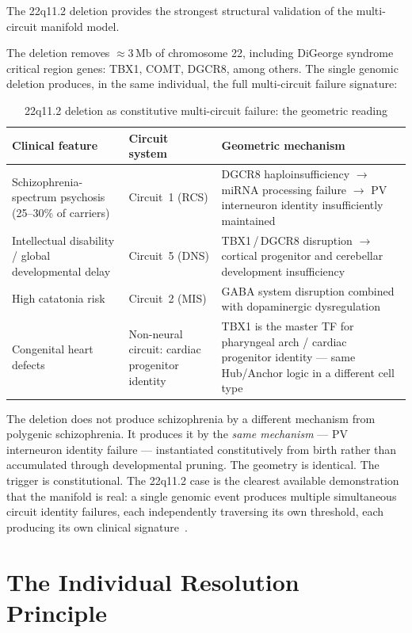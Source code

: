 \documentclass[12pt,a4paper]{article}
\begin{document}
The 22q11.2 deletion provides the strongest structural
validation of the multi-circuit manifold model.

The deletion removes $\approx$3\,Mb of chromosome 22,
including DiGeorge syndrome critical region genes:
TBX1, COMT, DGCR8, among others. The single genomic
deletion produces, in the same individual, the
full multi-circuit failure signature:

\begin{table}[ht!]
\centering
\caption{22q11.2 deletion as constitutive multi-circuit
  failure: the geometric reading}
\label{tab:22q}
\begin{tabular}{p{3.5cm}p{3.0cm}p{5.0cm}}
\toprule
\textbf{Clinical feature} &
\textbf{Circuit system} &
\textbf{Geometric mechanism} \\
\midrule
Schizophrenia-spectrum psychosis
(25--30\% of carriers) &
Circuit~1 (RCS) &
DGCR8 haploinsufficiency
$\to$ miRNA processing failure
$\to$ PV interneuron identity
insufficiently maintained \\[4pt]
Intellectual disability /
global developmental delay &
Circuit~5 (DNS) &
TBX1\,/\,DGCR8 disruption
$\to$ cortical progenitor
and cerebellar development
insufficiency \\[4pt]
High catatonia risk &
Circuit~2 (MIS) &
GABA system disruption
combined with dopaminergic
dysregulation \\[4pt]
Congenital heart defects &
Non-neural circuit:
cardiac progenitor identity &
TBX1 is the master TF for
pharyngeal arch / cardiac
progenitor identity ---
same Hub/Anchor logic
in a different cell type \\
\bottomrule
\end{tabular}
\end{table}

The deletion does not produce schizophrenia by a different
mechanism from polygenic schizophrenia. It produces it by
the \emph{same mechanism} --- PV interneuron identity
failure --- instantiated constitutively from birth rather
than accumulated through developmental pruning. The
geometry is identical. The trigger is constitutional.
The 22q11.2 case is the clearest available demonstration
that the manifold is real: a single genomic event produces
multiple simultaneous circuit identity failures, each
independently traversing its own threshold, each producing
its own clinical signature~\cite{Bassett2011}.

\section{The Individual Resolution Principle}
\end{document}
